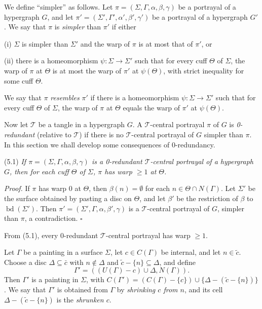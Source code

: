 We define ``simpler'' as follows. Let $\pi = (\Sigma, \Gamma, \alpha, \beta, \gamma)$ be a portrayal of a hypergraph $G$, and let $\pi' = (\Sigma', \Gamma', \alpha', \beta', \gamma')$ be a portrayal of a hypergraph $G'$. We say that $\pi$ is \textit{simpler} than $\pi'$ if either

\hspace*{12pt}(i) $\Sigma$ is simpler than $\Sigma'$ and the warp of $\pi$ is at most that of $\pi'$, or

\hspace*{12pt}(ii) there is a homeomorphism $\psi \colon \Sigma \to \Sigma'$ such that for every cuff $\Theta$ of $\Sigma$, the warp of $\pi$ at $\Theta$ is at most the warp of $\pi'$ at $\psi(\Theta)$, with strict inequality for some cuff $\Theta$.

We say that $\pi$ \textit{resembles} $\pi'$ if there is a homeomorphism $\psi \colon \Sigma \to \Sigma'$ such that for every cuff $\Theta$ of $\Sigma$, the warp of $\pi$ at $\Theta$ equals the warp of $\pi'$ at $\psi(\Theta)$.

Now let $\mathscr{T}$ be a tangle in a hypergraph $G$. A $\mathscr{T}$-central portrayal $\pi$ of $G$ is \textit{0-redundant} (relative to $\mathscr{T}$) if there is no $\mathscr{T}$-central portrayal of $G$ simpler than $\pi$. In this section we shall develop some consequences of 0-redundancy.

\stmt
(5.1) \textit{If $\pi = (\Sigma, \Gamma, \alpha, \beta, \gamma)$ is a 0-redundant $\mathscr{T}$-central portrayal of a hypergraph $G$, then for each cuff $\Theta$ of $\Sigma$, $\pi$ has warp $\ge 1$ at $\Theta$.}

\textit{Proof.} If $\pi$ has warp 0 at $\Theta$, then $\beta(n) = \emptyset$ for each $n \in \Theta \cap N(\Gamma)$. Let $\Sigma'$ be the surface obtained by pasting a disc on $\Theta$, and let $\beta'$ be the restriction of $\beta$ to $\operatorname{bd}(\Sigma')$. Then $\pi' = (\Sigma', \Gamma, \alpha, \beta', \gamma)$ is a $\mathscr{T}$-central portrayal of $G$, simpler than $\pi$, a contradiction. $\square$

From (5.1), every 0-redundant $\mathscr{T}$-central portrayal has warp $\ge 1$.

Let $\Gamma$ be a painting in a surface $\Sigma$, let $c \in C(\Gamma)$ be internal, and let $n \in \tilde{c}$. Choose a disc $\Delta \subseteq \bar{c}$ with $n \notin \Delta$ and $\tilde{c} - \{n\} \subseteq \Delta$, and define
\begin{equation*}
\Gamma' = ((U(\Gamma) - c) \cup \Delta, N(\Gamma)).
\end{equation*}
Then $\Gamma'$ is a painting in $\Sigma$, with $C(\Gamma') = (C(\Gamma) - \{c\}) \cup \{\Delta - (\tilde{c} - \{n\})\}$. We say that $\Gamma'$ is obtained from $\Gamma$ by \textit{shrinking $c$ from $n$}, and its cell $\Delta - (\tilde{c} - \{n\})$ is the \textit{shrunken $c$}.

